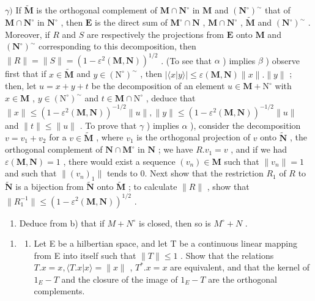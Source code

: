 \(\gamma)\) If \(\tilde{\mathbf{M}}\) is the orthogonal complement of \(\mathbf{M} \cap \mathbf{N}^{\circ}\) in \(\mathbf{M}\) and \((\mathbf{N}^{\circ})^{\sim}\) that of \(\mathbf{M} \cap \mathbf{N}^{\circ}\) in \(\mathbf{N}^{\circ}\) , then \(\mathbf{E}\) is the direct sum of \(\mathbf{M}^{\circ} \cap \mathbf{N}\) , \(\mathbf{M} \cap \mathbf{N}^{\circ}\) , \(\tilde{\mathbf{M}}\) and \((\mathbf{N}^{\circ})^{\sim}\) . Moreover, if \(R\) and \(S\) are respectively the projections from \(\mathbf{E}\) onto \(\mathbf{M}\) and \((\mathbf{N}^{\circ})^{\sim}\) corresponding to this decomposition, then \(\| R \| = \| S \| = (1 - \varepsilon^2 (\mathbf{M}, \mathbf{N}))^{1/2}\) . (To see that \(\alpha\) ) implies \(\beta\) ) observe first that if \(x \in \tilde{\mathbf{M}}\) and \(y \in (\mathrm{N}^\circ)^{\sim}\) , then \(|\langle x | y \rangle| \leqslant \varepsilon (\mathbf{M}, \mathbf{N}) \| x \| . \| y \|\) ; then, let \(u = x + y + t\) be the decomposition of an element \(u \in \mathbf{M} + \mathrm{N}^\circ\) with \(x \in \mathbf{M}\) , \(y \in (\mathrm{N}^\circ)^{\sim}\) and \(t \in \mathbf{M} \cap \mathrm{N}^\circ\) , deduce that \(\| x \| \leqslant (1 - \varepsilon^2 (\mathbf{M}, \mathbf{N}))^{-1/2} \| u \|, \| y \| \leqslant (1 - \varepsilon^2 (\mathbf{M}, \mathbf{N}))^{-1/2} \| u \|\) and \(\| t \| \leqslant \| u \|\) . To prove that \(\gamma\) ) implies \(\alpha\) ), consider the decomposition \(v = v_1 + v_2\) for a \(v \in \tilde{\mathbf{M}}\) , where \(v_1\) is the orthogonal projection of \(v\) onto \(\tilde{\mathbf{N}}\) , the orthogonal complement of \(\mathbf{N} \cap \mathbf{M}^\circ\) in \(\mathbf{N}\) ; we have \(R.v_1 = v\) , and if we had \(\varepsilon (\mathbf{M}, \mathbf{N}) = 1\) , there would exist a sequence \((v_n) \in \mathbf{M}\) such that \(\| v_n \| = 1\) and such that \(\| (v_n)_1\|\) tends to 0. Next show that the restriction \(R_1\) of \(R\) to \(\tilde{\mathbf{N}}\) is a bijection from \(\tilde{\mathbf{N}}\) onto \(\tilde{\mathbf{M}}\) ; to calculate \(\| R \|\) , show that \(\| R_1^{-1} \| \leqslant (1 - \varepsilon^2 (\mathbf{M}, \mathbf{N}))^{1/2}\) .

\begin{enumerate}
\def\labelenumi{\alph{enumi})}
\setcounter{enumi}{2}
\tightlist
\item
  Deduce from b) that if \(M + N^{\circ}\) is closed, then so is \(M^{\circ} + N\) .
\end{enumerate}

\begin{enumerate}
\def\labelenumi{\arabic{enumi})}
\setcounter{enumi}{7}
\tightlist
\item
  \begin{enumerate}
  \def\labelenumii{\alph{enumii})}
  \tightlist
  \item
    Let E be a hilbertian space, and let T be a continuous linear mapping from E into itself such that \(\|T\|\leqslant1\) . Show that the relations \(T.x=x,\langle T.x|x\rangle=\|x\|\) , \(T^{*}.x=x\) are equivalent, and that the kernel of \(1_{E}-T\) and the closure of the image of \(1_{E}-T\) are the orthogonal complements.
  \end{enumerate}
\end{enumerate}

